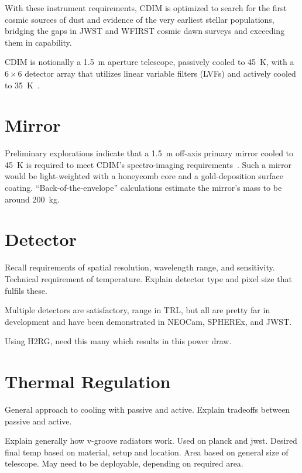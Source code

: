 \documentclass{ws-jai}
\begin{document}
With these instrument requirements, CDIM is optimized to search for the first cosmic sources of dust and evidence of the very earliest stellar populations, bridging the gaps in JWST and WFIRST cosmic dawn surveys and exceeding them in capability.

CDIM is notionally a \SI{1.5}{\meter} aperture telescope, passively cooled to \SI{45}{\kelvin}, with a $6\times6$ detector array that utilizes linear variable filters (LVFs) and actively cooled to \SI{35}{\kelvin}~\cite{cooray2016cdim2page}.

\section{Mirror}
\label{S:mirror}
Preliminary explorations indicate that a \SI{1.5}{\meter} off-axis primary mirror cooled to \SI{45}{\kelvin} is required to meet CDIM's spectro-imaging  requirements~\cite{cooray2016cdim2page}.
Such a mirror would be light-weighted with a honeycomb core and a gold-deposition surface coating.
``Back-of-the-envelope'' calculations estimate the mirror's mass to be around \SI{200}{\kilo\gram}.

\section{Detector}
\label{S:detector}
Recall requirements of spatial resolution, wavelength range, and sensitivity. Technical requirement of temperature. Explain detector type and pixel size that fulfils these.

Multiple detectors are satisfactory, range in TRL, but all are pretty far in development and have been demonstrated in NEOCam, SPHEREx, and JWST\@.

Using H2RG, need this many which results in this power draw.

\section{Thermal Regulation}
\label{S:tempregulation}
General approach to cooling with passive and active. Explain tradeoffs between passive and active.

Explain generally how v-groove radiators work.
Used on planck and jwst.
Desired final temp based on material, setup and location.
Area based on general size of telescope.
May need to be deployable, depending on required area.
\end{document}
